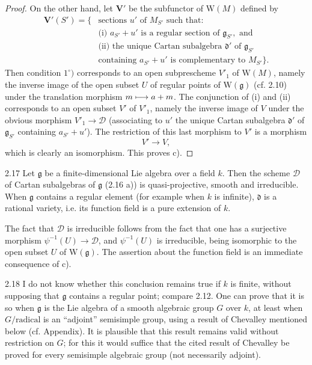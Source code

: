 \begin{proof}
On the other hand, let $\mathbf V'$ be the
subfunctor of $\mathrm W(M)$ defined by
\[
\begin{aligned}
 \mathbf V'(S')=\{&\text{sections }u'\text{ of }M_{S'}\text{ such that:}\\
 &\text{(i) }a_{S'}+u'\text{ is a regular section of }\mathfrak g_{S'},\text{ and}\\
 &\text{(ii) the unique Cartan subalgebra }\mathfrak d'\text{ of }\mathfrak g_{S'}\\
 &\text{containing }a_{S'}+u'\text{ is complementary to }M_{S'}\}.
\end{aligned}
\]
Then condition $1^\circ)$ corresponds to an open
subprescheme $V'_1$ of $\mathrm W(M)$, namely
the inverse image of the open subset $U$ of
regular points of $\mathrm W(\mathfrak g)$
(cf. 2.10) under the translation morphism
$m\longmapsto a+m$. The conjunction of (i) and (ii)
corresponds to an open subset $V'$ of $V'_1$,
namely the inverse image of $V$ under the
obvious morphism $V'_1\to\mathscr D$
(associating to $u'$ the unique Cartan
subalgebra $\mathfrak d'$ of $\mathfrak g_{S'}$
containing $a_{S'}+u'$). The restriction of
this last morphism to $V'$ is a morphism
\[
 V'\longrightarrow V,
\]
which is clearly an isomorphism. This proves c).
\end{proof}

\begin{corollary}{2.17}\label{XIV.2.17}
Let $\mathfrak g$ be a finite-dimensional Lie
algebra over a field $k$. Then the scheme
$\mathscr D$ of Cartan subalgebras of
$\mathfrak g$ (2.16 a)) is quasi-projective,
smooth and irreducible. When $\mathfrak g$
contains a regular element (for example
when $k$ is infinite), $\mathfrak d$ is a
rational variety, i.e. its function field
is a pure extension of $k$.
\end{corollary}
The fact that $\mathscr D$ is irreducible
follows from the fact that one has a
surjective morphism $\psi^{-1}(U)\to\mathscr D$,
and $\psi^{-1}(U)$ is irreducible, being
isomorphic to the open subset $U$ of
$\mathrm W(\mathfrak g)$. The assertion
about the function field is an immediate
consequence of c).

\begin{remarks}{2.18}\label{XIV.2.18}
I do not know whether this conclusion
remains true if $k$ is finite, without
supposing that $\mathfrak g$ contains a
regular point; compare 2.12. One can prove
that it is so when $\mathfrak g$ is the
Lie algebra of a smooth algebraic group
$G$ over $k$, at least when $G/\text{radical}$
is an ``adjoint'' semisimple group, using
a result of Chevalley mentioned below
(cf. Appendix). It is plausible that this
result remains valid without restriction
on $G$; for this it would suffice that
the cited result of Chevalley be proved
for every semisimple algebraic group
(not necessarily adjoint).
\end{remarks}

